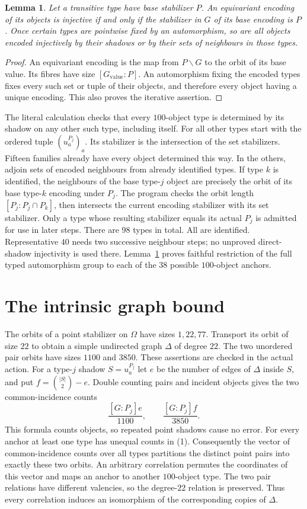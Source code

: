 \documentclass[11pt]{article}
\newtheorem{lemma}{Lemma}
\begin{document}
\begin{lemma}\label{faithful}
Let a transitive type have base stabilizer $P$. An equivariant encoding
of its objects is injective if and only if the stabilizer in $G$ of its
base encoding is $P$. Once certain types are pointwise fixed by an
automorphism, so are all objects encoded injectively by their shadows
or by their sets of neighbours in those types.
\end{lemma}
\begin{proof}
An equivariant encoding is the map from $P\backslash G$ to the orbit
of its base value. Its fibres have size $[G_{\mathrm{value}}:P]$.
An automorphism fixing the encoded types fixes every such set or tuple
of their objects, and therefore every object having a unique encoding.
This also proves the iterative assertion.
\end{proof}

The literal calculation checks that every $100$-object type is determined
by its shadow on any other such type, including itself. For all other
types start with the ordered tuple $(u_a^{P_j})_a$. Its stabilizer is
the intersection of the set stabilizers. Fifteen families already have
every object determined this way. In the others, adjoin sets of encoded
neighbours from already identified types. If type $k$ is identified,
the neighbours of the base type-$j$ object are precisely the orbit of
its base type-$k$ encoding under $P_j$. The program checks the orbit
length $[P_j:P_j\cap P_k]$, then intersects the current encoding
stabilizer with its set stabilizer. Only a type whose resulting
stabilizer equals its actual $P_j$ is admitted for use in later steps.
There are $98$ types in total. All are identified. Representative $40$
needs two successive neighbour steps; no unproved direct-shadow
injectivity is used there. Lemma~\ref{faithful} proves faithful
restriction of the full typed automorphism group to each of the $38$
possible $100$-object anchors.

\section*{The intrinsic graph bound}
The orbits of a point stabilizer on $\Omega$ have sizes $1,22,77$.
Transport its orbit of size $22$ to obtain a simple undirected graph
$\Delta$ of degree $22$. The two unordered pair orbits have sizes
$1100$ and $3850$. These assertions are checked in the actual action.
For a type-$j$ shadow $S=u_a^{P_j}$ let $e$ be the number of edges of
$\Delta$ inside $S$, and put $f=\binom{|S|}{2}-e$. Double counting
pairs and incident objects gives the two common-incidence counts
\[
 \frac{[G:P_j]e}{1100},\qquad
 \frac{[G:P_j]f}{3850}.                                      \tag{1}
\]
This formula counts objects, so repeated point shadows cause no error.
For every anchor at least one type has unequal counts in (1).
Consequently the vector of common-incidence counts over all types
partitions the distinct point pairs into exactly these two orbits.
An arbitrary correlation permutes the coordinates of this vector and
maps an anchor to another $100$-object type. The two pair relations
have different valencies, so the degree-$22$ relation is preserved.
Thus every correlation induces an isomorphism of the corresponding
copies of $\Delta$.
\end{document}
